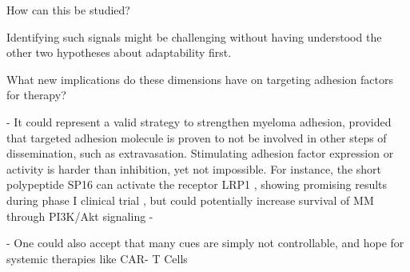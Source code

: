How can this be studied?

Identifying such signals might be challenging without
having understood the other two hypotheses about adaptability first.




What new implications do these dimensions have on targeting adhesion factors for
therapy?


- It could represent a valid strategy to
strengthen myeloma adhesion, provided that targeted adhesion molecule is proven
to not be involved in other steps of dissemination, such as extravasation.
Stimulating adhesion factor expression or activity is harder than inhibition,
yet not impossible. For instance, the short polypeptide SP16 can activate the
receptor LRP1 , showing promising results during phase I
clinical trial \cite{wohlfordPhaseClinicalTrial2021}, but could potentially
increase survival of MM through PI3K/Akt signaling
\cite{potereDevelopingLRP1Agonists2019, heinemannInhibitingPI3KAKT2022} -

- One could also accept that many cues are simply not controllable, and hope for
systemic therapies like CAR- T Cells




















